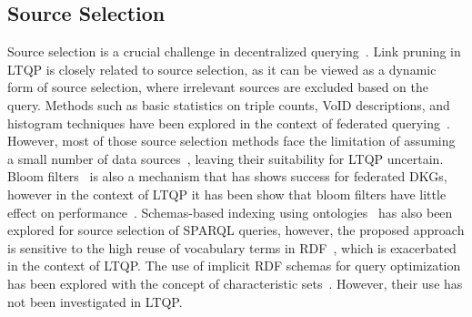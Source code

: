\iffalse
\rt{
    The following paragraph needs to be better structured.
    There's a lot of stuff in there, but it's not very coherent.
    It's introduced as source selection, but that's not accurate, as you mention SERVICE (which is an operator in SPARQL), summarization techniques for query optimization, ... Y
    ou also mix sparql federation and link traversal. 
    And then you end with some centralized techniques. 
    You may even want to have separate subsections for some of these topics. 
    Also think about what point you want to make for each subsection, and how it relates to your work (and then also make this clear to the reader).
}
\fi

\subsection{Source Selection}
Source selection is a crucial challenge in decentralized querying~\cite{hose2012towards, Harth2010}. 
Link pruning in LTQP is closely related to source selection, as it can be viewed as a dynamic form of source selection, where irrelevant sources are excluded based on the query.
Methods such as basic statistics on triple counts, VoID descriptions, and histogram techniques have been explored in the context of federated querying~\cite{hose2012towards, Harth2010, Montoya2017}.
However, most of those source selection methods face the limitation of assuming a small number of data sources~\cite{Harth2010}, leaving their suitability for LTQP uncertain.
Bloom filters~\cite{dia2018fast} is also a mechanism that has shows success for federated DKGs, however in the context of LTQP it has been show that bloom filters have little effect on performance~\cite{Hanski2024}.
Schemas-based indexing using ontologies~\cite{Stuckenschmidt2004} has also been explored for source selection of SPARQL queries,
however, the proposed approach is sensitive to the high reuse of vocabulary terms in RDF~\cite{Harth2010}, which is exacerbated in the context of LTQP.
The use of implicit RDF schemas for query optimization has been explored with the concept of characteristic sets~\cite{Neumann2011CharacteristicSA, Meimaris2017ExtendedCS, Montoya2017}.
However, their use has not been investigated in LTQP.